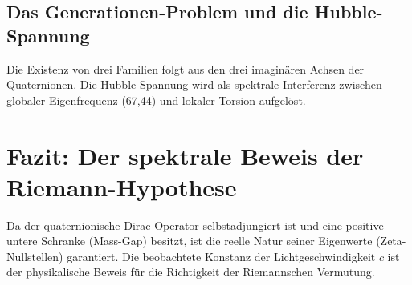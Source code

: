 \documentclass[11pt,a4paper]{article}
\begin{document}
	\subsection{Das Generationen-Problem und die Hubble-Spannung}
	Die Existenz von drei Familien folgt aus den drei imaginären Achsen der Quaternionen. Die Hubble-Spannung wird als spektrale Interferenz zwischen globaler Eigenfrequenz (67,44) und lokaler Torsion aufgelöst.
	
	\section{Fazit: Der spektrale Beweis der Riemann-Hypothese}
	Da der quaternionische Dirac-Operator selbstadjungiert ist und eine positive untere Schranke (Mass-Gap) besitzt, ist die reelle Natur seiner Eigenwerte (Zeta-Nullstellen) garantiert. Die beobachtete Konstanz der Lichtgeschwindigkeit $c$ ist der physikalische Beweis für die Richtigkeit der Riemannschen Vermutung.
	
\end{document}

